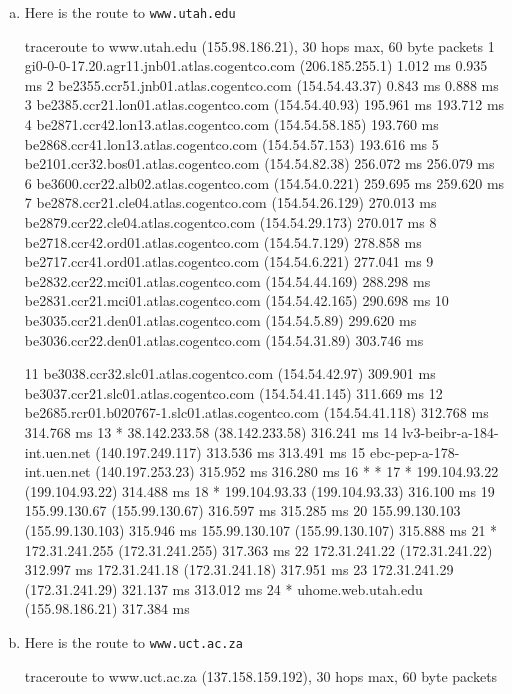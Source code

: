 \begin{enumerate}[a.]
\item Here is the route to {\tt www.utah.edu}
\begin{code}
traceroute to www.utah.edu (155.98.186.21), 30 hops max, 60 byte packets
 1  gi0-0-0-17.20.agr11.jnb01.atlas.cogentco.com (206.185.255.1)  1.012 ms  0.935 ms
 2  be2355.ccr51.jnb01.atlas.cogentco.com (154.54.43.37)  0.843 ms  0.888 ms
 3  be2385.ccr21.lon01.atlas.cogentco.com (154.54.40.93)  195.961 ms  193.712 ms
 4  be2871.ccr42.lon13.atlas.cogentco.com (154.54.58.185)  193.760 ms be2868.ccr41.lon13.atlas.cogentco.com (154.54.57.153)  193.616 ms
 5  be2101.ccr32.bos01.atlas.cogentco.com (154.54.82.38)  256.072 ms  256.079 ms
 6  be3600.ccr22.alb02.atlas.cogentco.com (154.54.0.221)  259.695 ms  259.620 ms
 7  be2878.ccr21.cle04.atlas.cogentco.com (154.54.26.129)  270.013 ms be2879.ccr22.cle04.atlas.cogentco.com (154.54.29.173)  270.017 ms
 8  be2718.ccr42.ord01.atlas.cogentco.com (154.54.7.129)  278.858 ms be2717.ccr41.ord01.atlas.cogentco.com (154.54.6.221)  277.041 ms
 9  be2832.ccr22.mci01.atlas.cogentco.com (154.54.44.169)  288.298 ms be2831.ccr21.mci01.atlas.cogentco.com (154.54.42.165)  290.698 ms
10  be3035.ccr21.den01.atlas.cogentco.com (154.54.5.89)  299.620 ms be3036.ccr22.den01.atlas.cogentco.com (154.54.31.89)  303.746 ms
\end{code}
\begin{code}
11  be3038.ccr32.slc01.atlas.cogentco.com (154.54.42.97)  309.901 ms be3037.ccr21.slc01.atlas.cogentco.com (154.54.41.145)  311.669 ms
12  be2685.rcr01.b020767-1.slc01.atlas.cogentco.com (154.54.41.118)  312.768 ms  314.768 ms
13  * 38.142.233.58 (38.142.233.58)  316.241 ms
14  lv3-beibr-a-184-int.uen.net (140.197.249.117)  313.536 ms  313.491 ms
15  ebc-pep-a-178-int.uen.net (140.197.253.23)  315.952 ms  316.280 ms
16  * *
17  * 199.104.93.22 (199.104.93.22)  314.488 ms
18  * 199.104.93.33 (199.104.93.33)  316.100 ms
19  155.99.130.67 (155.99.130.67)  316.597 ms  315.285 ms
20  155.99.130.103 (155.99.130.103)  315.946 ms 155.99.130.107 (155.99.130.107)  315.888 ms
21  * 172.31.241.255 (172.31.241.255)  317.363 ms
22  172.31.241.22 (172.31.241.22)  312.997 ms 172.31.241.18 (172.31.241.18)  317.951 ms
23  172.31.241.29 (172.31.241.29)  321.137 ms  313.012 ms
24  * uhome.web.utah.edu (155.98.186.21)  317.384 ms
\end{code}
\item Here is the route to {\tt www.uct.ac.za}
\begin{code}
traceroute to www.uct.ac.za (137.158.159.192), 30 hops max, 60 byte packets

\end{code}
\end{enumerate}
